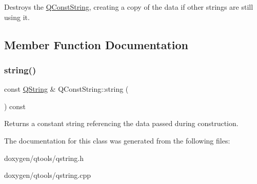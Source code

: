 Destroys the \mbox{\hyperlink{class_q_const_string}{Q\+Const\+String}}, creating a copy of the data if other strings are still using it. 

\subsection{Member Function Documentation}
\mbox{\label{class_q_const_string_a4a47c57ddfdf6d2ed902839f54101f57}} 
\subsubsection{\texorpdfstring{string()}{string()}}
{\footnotesize\ttfamily const \mbox{\hyperlink{class_q_string}{Q\+String}} \& Q\+Const\+String\+::string (\begin{DoxyParamCaption}{ }\end{DoxyParamCaption}) const\hspace{0.3cm}{\ttfamily [inline]}}

Returns a constant string referencing the data passed during construction. 

The documentation for this class was generated from the following files\+:\begin{DoxyCompactItemize}
\item 
doxygen/qtools/qstring.\+h\item 
doxygen/qtools/qstring.\+cpp\end{DoxyCompactItemize}
